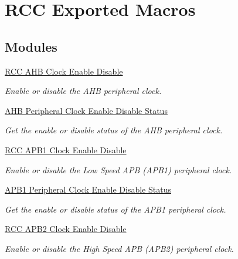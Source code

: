 \hypertarget{group___r_c_c___exported___macros}{}\section{R\+CC Exported Macros}
\label{group___r_c_c___exported___macros}
\subsection*{Modules}
\begin{DoxyCompactItemize}
\item 
\hyperlink{group___r_c_c___a_h_b___clock___enable___disable}{R\+C\+C A\+H\+B Clock Enable Disable}
\begin{DoxyCompactList}\small\item\em Enable or disable the A\+HB peripheral clock. \end{DoxyCompactList}\item 
\hyperlink{group___r_c_c___a_h_b___peripheral___clock___enable___disable___status}{A\+H\+B Peripheral Clock Enable Disable Status}
\begin{DoxyCompactList}\small\item\em Get the enable or disable status of the A\+HB peripheral clock. \end{DoxyCompactList}\item 
\hyperlink{group___r_c_c___a_p_b1___clock___enable___disable}{R\+C\+C A\+P\+B1 Clock Enable Disable}
\begin{DoxyCompactList}\small\item\em Enable or disable the Low Speed A\+PB (A\+P\+B1) peripheral clock. \end{DoxyCompactList}\item 
\hyperlink{group___r_c_c___a_p_b1___peripheral___clock___enable___disable___status}{A\+P\+B1 Peripheral Clock Enable Disable Status}
\begin{DoxyCompactList}\small\item\em Get the enable or disable status of the A\+P\+B1 peripheral clock. \end{DoxyCompactList}\item 
\hyperlink{group___r_c_c___a_p_b2___clock___enable___disable}{R\+C\+C A\+P\+B2 Clock Enable Disable}
\begin{DoxyCompactList}\small\item\em Enable or disable the High Speed A\+PB (A\+P\+B2) peripheral clock. \end{DoxyCompactList}\item 

\end{DoxyCompactItemize}
